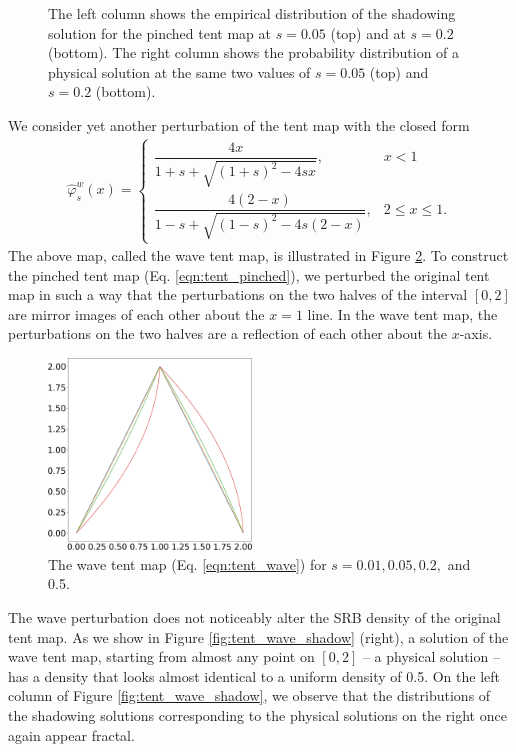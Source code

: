 \documentclass[preprint,12pt]{elsarticle}
\begin{document}
\begin{figure}
    \caption{The left column shows the empirical distribution of the shadowing solution for the pinched tent map at $s=0.05$ (top) and at $s=0.2$ (bottom). The right column shows the probability distribution of a physical solution at the same two values of $s = 0.05$ (top) and $s = 0.2$ (bottom).}
    \label{fig:tent_pinched_shadow}
\end{figure}
We consider yet another perturbation of the tent map with the closed form
\begin{align}
\hat{\varphi}^w_s(x) = \begin{cases}
        \dfrac{4x}{1 + s + \sqrt{(1+s)^2 - 4s x} }, & x < 1 \\
        \dfrac{4(2-x)}{1 - s + \sqrt{(1-s)^2 - 4s(2- x)} }, & 2 \leq x \leq 1.
    \end{cases}
    \label{eqn:tent_wave}
\end{align}
The above map, called the wave tent map, is illustrated in Figure \ref{fig:tent_wave}.
To construct the pinched tent map (Eq. \ref{eqn:tent_pinched}), we perturbed the original tent map in such a way that the perturbations on the two halves of the interval $[0,2]$ are mirror images of each other about the $x=1$ line. In the wave tent map, the perturbations on the two halves are a reflection of each other about the 
$x$-axis.
\begin{figure}
    \centering
    \includegraphics[width=0.48\textwidth]{wave_tent_map.png}
    \caption{The wave tent map (Eq. \ref{eqn:tent_wave}) for $s = 0.01, 0.05, 0.2,$ and 0.5.}
    \label{fig:tent_wave}
\end{figure}
The wave perturbation does not noticeably alter the SRB density of the original tent map. As we show in Figure \ref{fig:tent_wave_shadow} (right), a solution of the 
wave tent map, starting from almost any point on $[0,2]$ -- a physical solution -- has a density that looks almost identical to a uniform density of 0.5. On the left column of Figure \ref{fig:tent_wave_shadow}, we observe that the distributions of the shadowing solutions corresponding to the physical solutions on the right once again appear fractal.  
\end{document}
